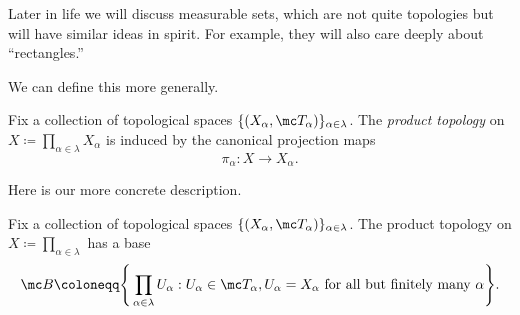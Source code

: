 \documentclass[../notes.tex]{subfiles}
\begin{document}
\begin{remark}
	Later in life we will discuss measurable sets, which are not quite topologies but will have similar ideas in spirit. For example, they will also care deeply about ``rectangles.''
\end{remark}
We can define this more generally.
\begin{defi}
	Fix a collection of topological spaces $\{(X_\alpha,\mc T_\alpha)\}_{\alpha\in\lambda}$. The \textit{product topology} on $X\coloneqq\prod_{\alpha\in\lambda}X_\alpha$ is induced by the canonical projection maps
	\[\pi_\alpha\colon X\to X_\alpha.\]
\end{defi}
Here is our more concrete description.
\begin{lemma} \label{lem:prodtopbase}
	Fix a collection of topological spaces $\{(X_\alpha,\mc T_\alpha)\}_{\alpha\in\lambda}$. The product topology on $X\coloneqq\prod_{\alpha\in\lambda}$ has a base
	\[\mc B\coloneqq\Bigg\{\prod_{\alpha\in\lambda}U_\alpha:U_\alpha\in\mc T_\alpha,U_\alpha=X_\alpha\text{ for all but finitely many }\alpha\Bigg\}.\]
\end{lemma}
\end{document}
